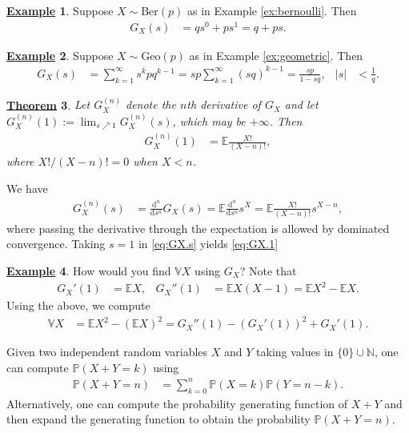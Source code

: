 \documentclass[12pt]{book}
\numberwithin{equation}{chapter}
\theoremstyle{plain}
\newtheorem{theorem}{\underline{Theorem}}
\numberwithin{theorem}{section}
\theoremstyle{definition}
\newtheorem{example}[theorem]{\underline{Example}}
\numberwithin{exercise}{chapter}
\let\oldendproof\endproof
\renewenvironment{proof}[1][\proofname]{%
  \oldproof[\scshape\underline{#1}]%
}{\oldendproof}
\newcommand{\<}{\langle}
\renewcommand{\>}{\rangle}
\renewcommand{\(}{\left(}
\renewcommand{\)}{\right)}
\renewcommand{\[}{\left[}
\renewcommand{\]}{\right]}
\newcommand\Eb{\mathds{E}}
\newcommand\Pb{\mathds{P}}
\newcommand\Nb{\mathds{N}}
\newcommand\Vb{\mathds{V}}
\newcommand\dd{\mathrm{d}}
\begin{document}
\begin{example}
Suppose $X \sim \text{Ber}(p)$ as in Example \ref{ex:bernoulli}.  Then
\begin{align}
G_X(s) 
	&= 	q s^0 + p s^1 
	=		q + p s .
\end{align}
\end{example}

\begin{example}
\label{ex:G.exp}
Suppose $X \sim \text{Geo}(p)$ as in Example \ref{ex:geometric}.  Then
\begin{align}
G_X(s)
	&=	\sum_{k=1}^\infty s^k p q^{k-1}
	=		sp \sum_{k=1}^\infty (sq)^{k-1}
	=		\frac{sp}{1-sq} , &
|s|
	&<	\frac{1}{q} .
\end{align}
\end{example}

\begin{theorem}
\label{thm:G.moments}
Let $G_X^{(n)}$ denote the $n$th derivative of $G_X$ and let $G_X^{(n)}(1) := \lim_{s \nearrow 1} G_X^{(n)}(s)$, which may be $+\infty$.  Then
\begin{align}
G_X^{(n)}(1)
	&=	\Eb \frac{X!}{(X-n)!} , \label{eq:GX.1}
\end{align}
where $X!/(X-n)! = 0$ when $X < n$.
\end{theorem}
\begin{proof}
We have
\begin{align}
G_X^{(n)}(s)
	&=	\frac{\dd^n}{\dd s^n} G_X(s)
	=		\Eb  \frac{\dd^n}{\dd s^n} s^X 
	=		\Eb  \frac{X!}{(X-n)!} s^{X-n} , \label{eq:GX.s}
\end{align}
where passing the derivative through the expectation is allowed by dominated convergence.
Taking $s=1$ in \eqref{eq:GX.s} yields \eqref{eq:GX.1}
\end{proof}

\begin{example}
How would you find $\Vb X $ using $G_X$?  Note that
\begin{align}
G_X'(1)
	&=	\Eb X  , &
G_X''(1)
	&=	\Eb X (X-1) = \Eb X^2  - \Eb X  . \label{eq:V.G}
\end{align}
Using the above, we compute
\begin{align}
\Vb X 
	&=	\Eb X^2  - (\Eb X)^2
	=		G_X''(1) - (G_X'(1))^2 + G_X'(1) . 
\end{align}
\end{example}

\noindent
Given two independent random variables $X$ and $Y$ taking values in $\{0\} \cup \Nb$, one can compute $\Pb( X+Y = k)$ using
\begin{align}
\Pb( X+Y = n)
	&=	\sum_{k=0}^n \Pb( X = k ) \Pb( Y = n-k ) .
\end{align}
Alternatively, one can compute the probability generating function of $X+Y$ and then expand the generating function to obtain the probability $\Pb(X+Y = n)$.
\end{document}
